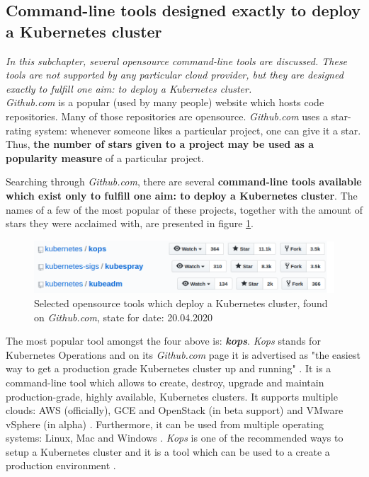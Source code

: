 \subsection{Command-line tools designed exactly to deploy a Kubernetes cluster}
\label{cli-tools-to-k8s}
\textit{In this subchapter, several opensource command-line tools are discussed. These tools are not supported by any particular cloud provider, but they are designed exactly to fulfill one aim: to deploy a Kubernetes cluster.}
\\

\textit{Github.com} is a popular (used by many people) website which hosts code repositories. Many of those repositories are opensource.  \textit{Github.com} uses a star-rating system: whenever someone likes a particular project, one can give it a star. Thus, \textbf{the number of stars given to a project may be used as a popularity measure} of a particular project.

Searching through \textit{Github.com}, there are several \textbf{command-line tools available which exist only to fulfill one aim: to deploy a Kubernetes cluster}. The names of a few of the most popular of these projects, together with the amount of stars they were acclaimed with, are presented in figure \ref{fig:ct}.

\begin{figure}[H]
    \centering
    \includegraphics[width=15cm]{figures/custom-tools.png}
    \captionsetup{justification=centering,margin=2cm}
    \caption{Selected opensource tools which deploy a Kubernetes cluster, found on \textit{Github.com}, state for date: 20.04.2020}
    \label{fig:ct}
\end{figure}

The most popular tool amongst the four above is: \textbf{\textit{kops}}. \textit{Kops} stands for Kubernetes Operations and on its \textit{Github.com} page it is advertised as "the easiest way to get a production grade Kubernetes cluster up and running" \cite{online-kops-gh}. It is a command-line tool which allows to create, destroy, upgrade and maintain production-grade, highly available, Kubernetes clusters. It supports multiple clouds: AWS (officially), GCE and OpenStack (in beta support) and VMware vSphere (in alpha) \cite{online-kops-gh}. Furthermore, it can be used from multiple operating systems: Linux, Mac and Windows \cite{online-kops-install}. \textit{Kops} is one of the recommended ways to setup a Kubernetes cluster and it is a tool which can be used to a create a production environment \cite{book-devops-with-k8s}.


